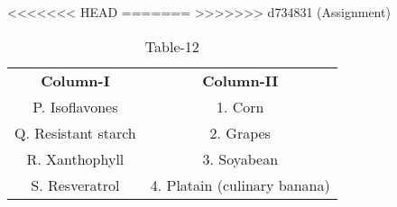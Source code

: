 \begin{table}[htbp]
  \centering
  \caption{Table-12}
<<<<<<< HEAD
  \label{tab:tables/table12.tex}
=======
  \label{table12}
>>>>>>> d734831 (Assignment)
  \begin{tabular}{cc}
\textbf{Column-I} & \textbf{Column-II}\\

P. Isoflavones & 1. Corn \\
Q. Resistant starch & 2. Grapes \\
R. Xanthophyll & 3. Soyabean \\
S. Resveratrol & 4. Platain (culinary banana) \\
  
  
  
  \end{tabular}
\end{table}